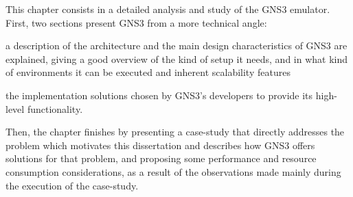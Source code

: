 

This chapter consists in a detailed analysis and study of the GNS3 emulator.
First, two sections present GNS3 from a more technical angle:
  \begin{enumerate*}[label=(\roman*), itemjoin={{, }}, itemjoin*={{, and }}]
  \item a description of the architecture and the main design characteristics of GNS3 are explained, giving a good overview of the kind of setup it needs, and in what kind of environments it can be executed and inherent scalability features
  \item the implementation solutions chosen by GNS3's developers to provide its high-level functionality.
  \end{enumerate*}
Then, the chapter finishes by presenting a case-study that directly addresses the problem which motivates this dissertation and describes how GNS3 offers solutions for that problem, and proposing some performance and resource consumption considerations, as a result of the observations made mainly during the execution of the case-study.







